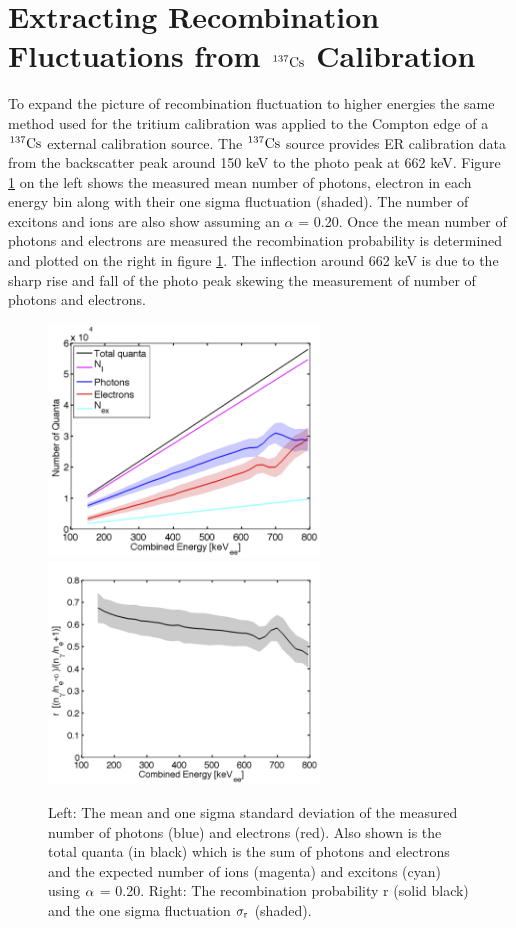 \newpage

\section{Extracting Recombination Fluctuations from $\rm ^{137}Cs$ Calibration}

To expand the picture of recombination fluctuation to higher energies the same method used for the tritium calibration was applied to the Compton edge of a $\rm ^{137}Cs$ external calibration source. The $\rm ^{137}Cs$ source provides ER calibration data from the backscatter peak around 150 keV to the photo peak at 662 keV. Figure \ref{fig:Cs_LYQYR} on the left shows the measured mean number of photons, electron in each energy bin along with their one sigma fluctuation (shaded). The number of excitons and ions are also show assuming an $\alpha$ = 0.20. Once the mean number of photons and electrons are measured the recombination probability is determined and plotted on the right in figure \ref{fig:Cs_LYQYR}. The inflection around 662 keV is due to the sharp rise and fall of the photo peak skewing the measurement of number of photons and electrons.

\begin{figure}[h!]\centering
\includegraphics[width=72mm]{Chapter_Flucs/Figures/Cs/quanta_cs_.png}
\includegraphics[width=72mm]{Chapter_Flucs/Figures/Cs/R_cs_.png}
\caption{ Left: The mean and one sigma standard deviation of the measured number of photons (blue) and electrons (red). Also shown is the total quanta (in black) which is the sum of photons and electrons and the expected number of ions (magenta) and excitons (cyan) using $\rm \alpha$ = 0.20. Right: The recombination probability r (solid black) and the one sigma fluctuation $\rm \sigma_{r}$ (shaded). }
\label{fig:Cs_LYQYR}
\end{figure}


